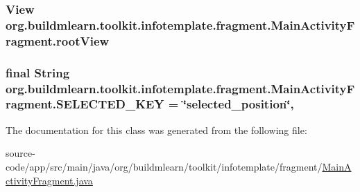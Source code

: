 \subsubsection[{\texorpdfstring{root\+View}{rootView}}]{\setlength{\rightskip}{0pt plus 5cm}View org.\+buildmlearn.\+toolkit.\+infotemplate.\+fragment.\+Main\+Activity\+Fragment.\+root\+View\hspace{0.3cm}{\ttfamily [private]}}\hypertarget{classorg_1_1buildmlearn_1_1toolkit_1_1infotemplate_1_1fragment_1_1MainActivityFragment_a84e5e1104c11cdeb372150575d0afa67}{}\label{classorg_1_1buildmlearn_1_1toolkit_1_1infotemplate_1_1fragment_1_1MainActivityFragment_a84e5e1104c11cdeb372150575d0afa67}
\subsubsection[{\texorpdfstring{S\+E\+L\+E\+C\+T\+E\+D\+\_\+\+K\+EY}{SELECTED_KEY}}]{\setlength{\rightskip}{0pt plus 5cm}final String org.\+buildmlearn.\+toolkit.\+infotemplate.\+fragment.\+Main\+Activity\+Fragment.\+S\+E\+L\+E\+C\+T\+E\+D\+\_\+\+K\+EY = \char`\"{}selected\+\_\+position\char`\"{}\hspace{0.3cm}{\ttfamily [static]}, {\ttfamily [private]}}\hypertarget{classorg_1_1buildmlearn_1_1toolkit_1_1infotemplate_1_1fragment_1_1MainActivityFragment_a32e713240eae9424c533794661ed9443}{}\label{classorg_1_1buildmlearn_1_1toolkit_1_1infotemplate_1_1fragment_1_1MainActivityFragment_a32e713240eae9424c533794661ed9443}


The documentation for this class was generated from the following file\+:\begin{DoxyCompactItemize}
\item 
source-\/code/app/src/main/java/org/buildmlearn/toolkit/infotemplate/fragment/\hyperlink{infotemplate_2fragment_2MainActivityFragment_8java}{Main\+Activity\+Fragment.\+java}\end{DoxyCompactItemize}

